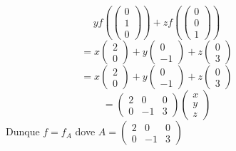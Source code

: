\documentclass[a4paper]{article}
\theoremstyle{break}
\theoremstyle{break}
\theoremstyle{break}
\theoremstyle{break}
\begin{document}
\begin{figure}[H]
\begin{example}
\[    yf\left( \begin{pmatrix} 0\\1\\0 \end{pmatrix}  \right) +
    zf\left( \begin{pmatrix} 0\\0\\1 \end{pmatrix}  \right) 
    \] 
    \[
    = x \begin{pmatrix} 2\\0 \end{pmatrix} +
    y \begin{pmatrix} 0\\-1 \end{pmatrix} +
    z \begin{pmatrix} 0\\3 \end{pmatrix} 
    \] 
    \[
    = x \begin{pmatrix} 2\\0 \end{pmatrix} +
    y \begin{pmatrix} 0\\-1 \end{pmatrix} +
    z \begin{pmatrix} 0\\3 \end{pmatrix} 
    \] 
    \[
    = \begin{pmatrix} 
      2 & 0 & 0\\
      0 & -1 & 3
    \end{pmatrix} 
    \begin{pmatrix} x\\y\\z \end{pmatrix} 
    \] 
    Dunque \( f = f_A \) dove \( A = \begin{pmatrix} 2 & 0 & 0\\ 0 & -1 & 3 \end{pmatrix}  \) 
  \end{example}
\end{figure}
\end{document}
